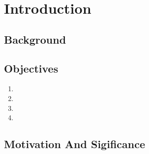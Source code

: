




\chapter{Introduction}

\section{{\bf{Background}}}








\section{{\bf{Objectives}}}
{\bf\color{black}
\begin{enumerate}
 \item
 \item 
 \item 
 \item 
\end{enumerate}
}

\section{\bf Motivation And Sigificance}
\noindent




